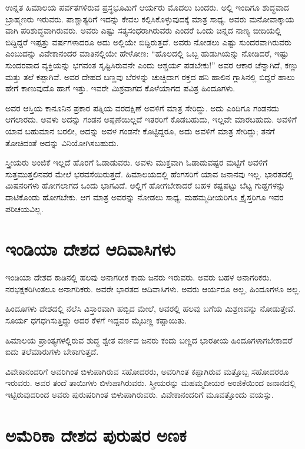 ಉನ್ನತ ಹಿಮಾಲಯ ಪರ್ವತಗಳಿರುವ ಪ್ರಸ್ಥಭೂಮಿಗೆ ಆರ್ಯರು ಮೊದಲು ಬಂದರು. ಅಲ್ಲಿ ಇಂದಿಗೂ ಶುದ್ಧವಾದ ಬ್ರಾಹ್ಮಣರು ಇರುವರು. ಪಾಶ್ಚಾತ್ಯರಿಗೆ ಇದನ್ನು ಕೇವಲ ಕಲ್ಪಿಸಿಕೊಳ್ಳುವುದಕ್ಕೆ ಮಾತ್ರ ಸಾಧ್ಯ. ಅವರು ಮನೋವಾಕ್ಕಾಯ ವಾಗಿ ಪರಿಶುದ್ಧವಾಗಿರುವರು. ಅವರು ಎಷ್ಟು ಸತ್ಯಸಂಧರಾಗಿರುವರು ಎಂದರೆ ಒಂದು ಚಿನ್ನದ ನಾಣ್ಯ ಬೀದಿಯಲ್ಲಿ ಬಿದ್ದಿದ್ದರೆ ಇಪ್ಪತ್ತು ವರ್ಷಗಳಾದರೂ ಅದು ಅಲ್ಲಿಯೇ ಬಿದ್ದಿರುತ್ತದೆ. ಅವರು ನೋಡಲು ಎಷ್ಟು ಸುಂದರವಾಗಿರುವರು ಎಂಬುದನ್ನು ವಿವೇಕಾನಂದರ ಮಾತಿನಲ್ಲಿಯೇ ಹೇಳೋಣ: “ಹೊಲದಲ್ಲಿ ಒಬ್ಬ ಹುಡುಗಿಯನ್ನು ನೋಡಿದರೆ, ಇಷ್ಟು ಸುಂದರವಾದ ವ್ಯಕ್ತಿಯನ್ನು ಭಗವಂತ ಸೃಷ್ಟಿಸಿರುವನೇ ಎಂದು ಆಶ್ಚರ್ಯ ಪಡಬೇಕು!” ಅವರ ಆಕಾರ ಚೆನ್ನಾಗಿದೆ, ಕಣ್ಣು ಮತ್ತು ತಲೆ ಕಪ್ಪಾಗಿವೆ. ಅವರ ದೇಹದ ಬಣ್ಣವು ಬೆರಳನ್ನು ಚುಚ್ಚಿದಾಗ ರಕ್ತದ ಹನಿ ಹಾಲಿನ ಗ್ಲಾಸಿನಲ್ಲಿ ಬಿದ್ದರೆ ಹಾಲು ಹೇಗೆ ಕಾಣುವುದೊ ಹಾಗೆ ಇತ್ತು. ಇವರೇ ಮಿಶ್ರವಾಗದ ಕೊಳೆಯಾಗದ ಪವಿತ್ರ ಹಿಂದೂಗಳು.

ಅವರ ಆಸ್ತಿಯ ಕಾನೂನಿನ ಪ್ರಕಾರ ಪತ್ನಿಯ ವರದಕ್ಷಿಣೆ ಅವಳಿಗೆ ಮಾತ್ರ ಸೇರಿದ್ದು. ಅದು ಎಂದಿಗೂ ಗಂಡನದು ಆಗಲಾರದು. ಅವಳು ಅದನ್ನು ಗಂಡನ ಅಪ್ಪಣೆಯಿಲ್ಲದೆ ಇತರರಿಗೆ ಕೊಡಬಹುದು, ಇಲ್ಲವೇ ಮಾರಬಹುದು. ಅವಳಿಗೆ ಯಾವ ಬಹುಮಾನ ಬರಲೀ, ಅದನ್ನು ಅವಳ ಗಂಡನೇ ಕೊಟ್ಟಿದ್ದರೂ, ಅದು ಅವಳಿಗೆ ಮಾತ್ರ ಸೇರಿದ್ದು; ತನಗೆ ತೋಚಿದಂತೆ ಅದನ್ನು ವಿನಿಯೋಗಿಸಬಹುದು.

ಸ್ತ್ರೀಯರು ಅಂಜಿಕೆ ಇಲ್ಲದೆ ಹೊರಗೆ ಓಡಾಡುವರು. ಅವಳು ಮುಕ್ತವಾಗಿ ಓಡಾಡುವಷ್ಟರ ಮಟ್ಟಿಗೆ ಅವಳಿಗೆ ಸುತ್ತಮುತ್ತಲಿನವರ ಮೇಲೆ ಭರವಸೆಯಿರುತ್ತದೆ. ಹಿಮಾಲಯದಲ್ಲಿ ಹೆಂಗಸರಿಗೆ ಯಾವ ಜನಾನವು ಇಲ್ಲ. ಭಾರತದಲ್ಲಿ ಮಿಷನರಿಗಳು ಹೋಗಲಾಗದ ಒಂದು ಭಾಗವಿದೆ. ಅಲ್ಲಿಗೆ ಹೋಗಬೇಕಾದರೆ ಬಹಳ ಕಷ್ಟಪಟ್ಟು ಬೆಟ್ಟ ಗುಡ್ಡಗಳನ್ನು ದಾಟಿಕೊಂಡು ಹೋಗಬೇಕು. ಆಗ ಮಾತ್ರ ಅವರನ್ನು ನೋಡಲು ಸಾಧ್ಯ. ಮಹಮ್ಮದೀಯರಿಗೂ ಕ್ರೈಸ್ತರಿಗೂ ಇವರ ಪರಿಚಯವಿಲ್ಲ.

\delimiter


\section{ಇಂಡಿಯಾ ದೇಶದ ಆದಿವಾಸಿಗಳು}

ಇಂಡಿಯಾ ದೇಶದ ಕಾಡಿನಲ್ಲಿ ಹಲವು ಅನಾಗರೀಕ ಕಾಡು ಜನರು ಇರುವರು. ಅವರು ಬಹಳ ಅನಾಗರಿಕರು. ನರಭಕ್ಷಕರಿಗಿಂತಲೂ ಅನಾಗರಿಕರು. ಅವರೇ ಭಾರತದ ಆದಿವಾಸಿಗಳು. ಅವರು ಆರ್ಯರೂ ಅಲ್ಲ, ಹಿಂದೂಗಳೂ ಅಲ್ಲ.

ಹಿಂದೂಗಳು ದೇಶದಲ್ಲಿ ನೆಲೆಸಿ ವಿಸ್ತಾರವಾಗಿ ಹಬ್ಬಿದ ಮೇಲೆ, ಅವರಲ್ಲಿ ಹಲವು ಬಗೆಯ ಮಿಶ್ರಣವನ್ನು ನೋಡುತ್ತೇವೆ. ಸೂರ್ಯ ಧಗಧಗಿಸುತ್ತಿದ್ದು ಅದರ ಕೆಳಗೆ ಇದ್ದವರ ಮೈಬಣ್ಣ ಕಪ್ಪಾಯಿತು.

ಹಿಮಾಲಯ ಪ್ರಾಂತ್ಯಗಳಲ್ಲಿರುವ ಶುದ್ಧ ಶ್ವೇತ ವರ್ಣದ ಜನರು ಕಂದು ಬಣ್ಣದ ಭಾರತೀಯ ಹಿಂದೂಗಳಾಗಬೇಕಾದರೆ ಐದು ತಲೆಮಾರುಗಳು ಬೇಕಾಗುತ್ತದೆ.

ವಿವೇಕಾನಂದರಿಗೆ ಅವರಿಗಿಂತ ಬಿಳುಪಾಗಿರುವ ಸಹೋದರರು, ಅವರಿಗಿಂತ ಕಪ್ಪಾಗಿರುವ ಮತ್ತೊಬ್ಬ ಸಹೋದರರೂ ಇರುವರು. ಅವರ ತಂದೆ ತಾಯಿಗಳು ಬಿಳುಪಾಗಿರುವರು. ಸ್ತ್ರೀಯರನ್ನು ಮಹಮ್ಮದೀಯರ ಅಂಜಿಕೆಯಿಂದ ಜನಾನದಲ್ಲಿ ಇಟ್ಟಿರುವುದರಿಂದ ಅವರು ಪುರುಷರಿಗಿಂತ ಬಿಳುಪಾಗಿರುವರು. ವಿವೇಕಾನಂದರಿಗೆ ಮೂವತ್ತೊಂದು ವಯಸ್ಸು.

\delimiter


\section{ಅಮೆರಿಕಾ ದೇಶದ ಪುರುಷರ ಅಣಕ}

